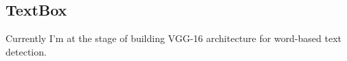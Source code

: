 \documentclass{article}
\begin{document}
\subsection{TextBox}
Currently I'm at the stage of building VGG-16 architecture for word-based text detection.



\end{document}
